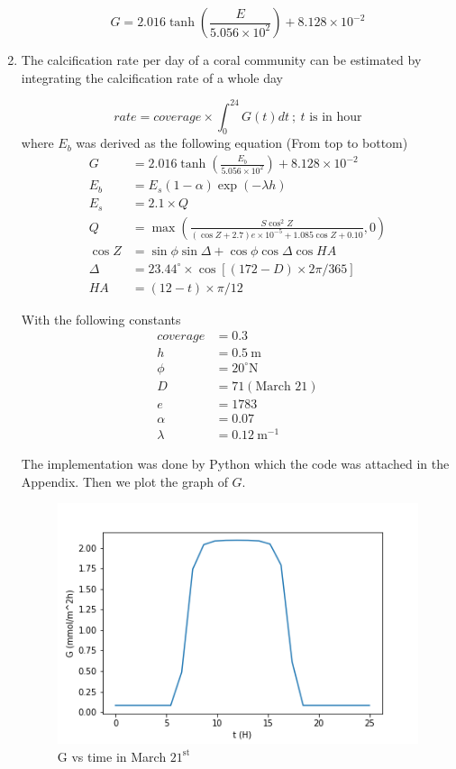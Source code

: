 \documentclass[a4paper]{report}
\begin{document}
\begin{enumerate}
\[G = 2.016\tanh{\left(\frac{E}{5.056\times 10^2}\right)} + 8.128\times 10^{-2}\]

\item The calcification rate per day of a coral community can be estimated by integrating the calcification rate of a whole day

\begin{equation}
    rate = coverage \times \int^{24}_{0} G(t) dt \ ;\  t \text{ is in hour}
\end{equation}
where $E_b$ was derived as the following equation (From top to bottom)
\begin{align*}
G &= 2.016\tanh{\left(\frac{E_b}{5.056\times 10^2}\right)} + 8.128\times 10^{-2}\\
    E_b &= E_s(1-\alpha)\exp(-\lambda h) \\
    E_s &= 2.1\times Q\\
    Q &= \max \left(\frac{S\cos^2Z}{(\cos Z+2.7)e\times10^{-5}+1.085\cos Z+0.10}, 0\right)\\
    \cos Z &= \sin\phi\sin\Delta + \cos\phi\cos\Delta\cos HA\\
    \Delta &= 23.44^{\circ}\times\cos[(172-D)\times2\pi/365]\\
    HA &= (12 - t) \times \pi / 12
\end{align*}

With the following constants
\begin{align*}
    coverage &= 0.3\\
    h &= 0.5 \ \text{m}\\
    \phi &= 20^{\circ}\text{N}\\
    D &= 71 (\text{March 21})\\
    e &= 1783\\
    \alpha &= 0.07\\
    \lambda &= 0.12\ \text{m}^{-1}
\end{align*}

The implementation was done by Python which the code was attached in the Appendix. Then we plot the graph of $G$.

\begin{figure}[H]
    \centering
    \includegraphics{G4-t.png}
    \caption{G vs time in March $21^{\text{st}}$}
    \label{fig:my_label}
\end{figure}


\end{enumerate}
\end{document}
